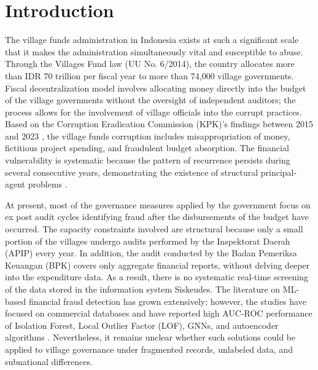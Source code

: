 \documentclass[3p,times,procedia]{elsarticle}
\begin{document}
\vspace*{-6pt}

\section{Introduction}
\label{sec:intro}

The village funds administration in Indonesia exists at such a significant scale that it makes the administration simultaneously vital and susceptible to abuse. Through the Villages Fund law (UU No. 6/2014), the country allocates more than IDR 70 trillion per fiscal year to more than 74,000 village governments. Fiscal decentralization model involves allocating money directly into the budget of the village governments without the oversight of independent auditors; the process allows for the involvement of village officials into the corrupt practices. Based on the Corruption Eradication Commission (KPK)'s findings between 2015 and 2023 \cite{method_kpk2023}, the village funds corruption includes misappropriation of money, fictitious project spending, and fraudulent budget absorption. The financial vulnerability is systematic because the pattern of recurrence persists during several consecutive years, demonstrating the existence of structural principal-agent problems \cite{method_jensen1976}.

At present, most of the governance measures applied by the government focus on ex post audit cycles identifying fraud after the disbursements of the budget have occurred. The capacity constraints involved are structural because only a small portion of the villages undergo audits performed by the Inspektorat Daerah (APIP) every year. In addition, the audit conducted by the Badan Pemeriksa Keuangan (BPK) covers only aggregate financial reports, without delving deeper into the expenditure data. As a result, there is no systematic real-time screening of the data stored in the information system Siskeudes. The literature on ML-based financial fraud detection has grown extensively; however, the studies have focused on commercial databases and have reported high AUC-ROC performance of Isolation Forest, Local Outlier Factor (LOF), GNNs, and autoencoder algorithms \cite{p003,p007,p015,p022,p026,p041,p043}. Nevertheless, it remains unclear whether such solutions could be applied to village governance under fragmented records, unlabeled data, and subnational differences.
\end{document}
